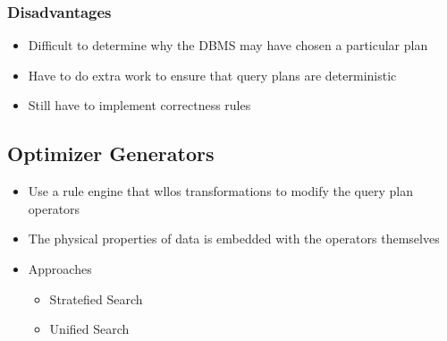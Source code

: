 \documentclass[11pt]{article}
\begin{document}
\begin{itemize}
        \subsubsection*{Disadvantages}
        \begin{itemize}
            \item Difficult to determine why the DBMS may have chosen a particular plan
            \item Have to do extra work to ensure that query plans are deterministic
            \item Still have to implement correctness rules
        \end{itemize}
    \end{itemize}

    \subsection*{Optimizer Generators}
    \begin{itemize}
        \item Use a rule engine that wllos transformations to modify the query plan operators
        \item The physical properties of data is embedded with the operators themselves
        \item Approaches
        \begin{itemize}
            \item Stratefied Search
            \item Unified Search
        \end{itemize}

    \end{itemize}
\end{document}
